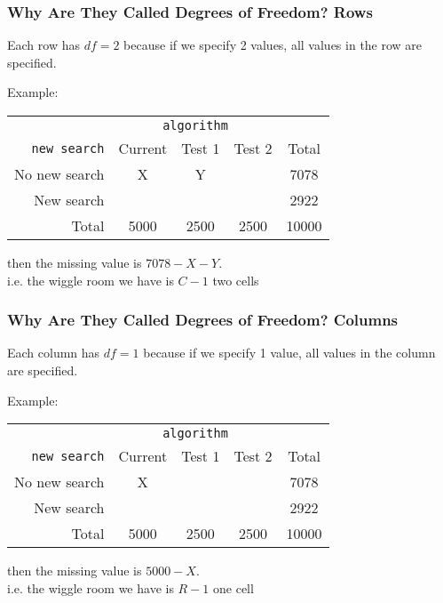 \documentclass[handout]{beamer}
\newcommand{\blue}[1]{\textcolor{blue2}{#1}}
\begin{document}
\begin{frame}
\frametitle{Why Are They Called Degrees of Freedom? Rows}

Each row has $df=2$ because if we specify 2 values, all values in the row are specified.  

\vspace{0.5cm}

Example:
\begin{center}
  \begin{tabular}{r|ccc|c}
& \multicolumn{3}{c|}{{\tt algorithm}} & \\
       {\tt new search} & Current & Test 1 & Test 2 & Total \\ 
\hline
    No new search & X & Y &  & 7078 \\ 
    New search &  &  &  & 2922 \\ 
\hline
    Total & 5000 & 2500 & 2500 & 10000 \\ 
  \end{tabular}
\end{center}
\pause
then the missing value is $7078-X-Y$.\\ 
i.e. the \blue{wiggle room} we have is $C-1$ two cells

\end{frame}


\begin{frame}
\frametitle{Why Are They Called Degrees of Freedom? Columns}

Each column has $df=1$ because if we specify 1 value, all values in the column are specified.  

\vspace{0.5cm}

Example:
\begin{center}
  \begin{tabular}{r|ccc|c}
& \multicolumn{3}{c|}{{\tt algorithm}} & \\
       {\tt new search} & Current & Test 1 & Test 2 & Total \\ 
\hline
    No new search & X &  &  & 7078 \\ 
    New search &  &  &  & 2922 \\ 
\hline
    Total & 5000 & 2500 & 2500 & 10000 \\ 
  \end{tabular}
\end{center}
\pause
then the missing value is $5000-X$.\\ 
i.e. the \blue{wiggle room} we have is $R-1$ one cell

\end{frame}
\end{document}
